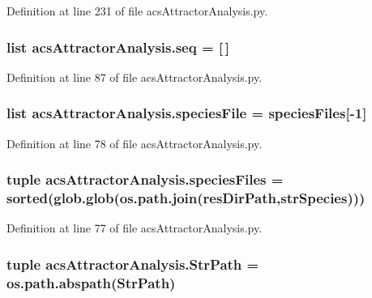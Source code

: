 Definition at line 231 of file acs\-Attractor\-Analysis.\-py.

\hypertarget{a00090_a33bc0e3fc99bab3df33d3f1626a19528}{
\subsubsection[{seq}]{\setlength{\rightskip}{0pt plus 5cm}list acs\-Attractor\-Analysis.\-seq = \mbox{[}$\,$\mbox{]}}}\label{a00090_a33bc0e3fc99bab3df33d3f1626a19528}


Definition at line 87 of file acs\-Attractor\-Analysis.\-py.

\hypertarget{a00090_a0e036b776f4f724254115c2e284657eb}{
\subsubsection[{species\-File}]{\setlength{\rightskip}{0pt plus 5cm}list acs\-Attractor\-Analysis.\-species\-File = {\bf species\-Files}\mbox{[}-\/1\mbox{]}}}\label{a00090_a0e036b776f4f724254115c2e284657eb}


Definition at line 78 of file acs\-Attractor\-Analysis.\-py.

\hypertarget{a00090_a670249d163388a9d93c8f3b9fb63afac}{
\subsubsection[{species\-Files}]{\setlength{\rightskip}{0pt plus 5cm}tuple acs\-Attractor\-Analysis.\-species\-Files = sorted(glob.\-glob(os.\-path.\-join({\bf res\-Dir\-Path},{\bf str\-Species})))}}\label{a00090_a670249d163388a9d93c8f3b9fb63afac}


Definition at line 77 of file acs\-Attractor\-Analysis.\-py.

\hypertarget{a00090_a60fb7d39ab8835d4b764461220e796e2}{
\subsubsection[{Str\-Path}]{\setlength{\rightskip}{0pt plus 5cm}tuple acs\-Attractor\-Analysis.\-Str\-Path = os.\-path.\-abspath(Str\-Path)}}\label{a00090_a60fb7d39ab8835d4b764461220e796e2}


